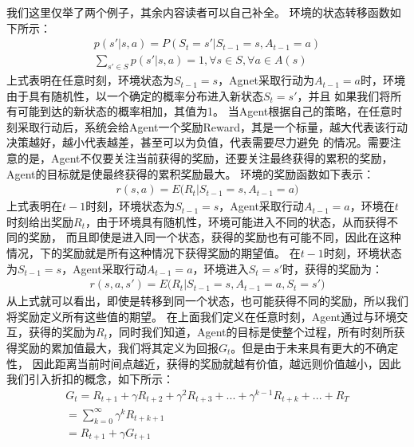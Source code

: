 我们这里仅举了两个例子，其余内容读者可以自己补全。
环境的状态转移函数如下所示：
\begin{equation}
\begin{aligned}
p(s' | s, a) = P(S_{t}=s' | S_{t-1}=s, A_{t-1}=a) \\
\sum_{s' \in S} p(s' | s, a) = 1, \forall s \in S, \forall a \in A(s)
\end{aligned}
\label{env-state-transition-function}
\end{equation}
上式表明在任意时刻，环境状态为$S_{t-1}=s$，Agnet采取行动为$A_{t-1}=a$时，环境由于具有随机性，以一个确定的概率分布进入新状态$S_{t}=s'$，并且
如果我们将所有可能到达的新状态的概率相加，其值为1。
当Agent根据自己的策略，在任意时刻采取行动后，系统会给Agent一个奖励Reward，其是一个标量，越大代表该行动决策越好，越小代表越差，甚至可以为负值，代表需要尽力避免
的情况。需要注意的是，Agent不仅要关注当前获得的奖励，还要关注最终获得的累积的奖励，Agent的目标就是使最终获得的累积奖励最大。
环境的奖励函数如下表示：
\begin{equation}
\begin{aligned}
r(s, a) = E\bigg( R_{t} | S_{t-1}=s, A_{t-1}=a \bigg)
\end{aligned}
\label{env-reward-function}
\end{equation}
上式表明在$t-1$时刻，环境状态为$S_{t-1}=s$，Agent采取行动$A_{t-1}=a$，环境在$t$时刻给出奖励$R_{t}$，由于环境具有随机性，环境可能进入不同的状态，从而获得不同的奖励，
而且即使是进入同一个状态，获得的奖励也有可能不同，因此在这种情况，下的奖励就是所有这种情况下获得奖励的期望值。
在$t-1$时刻，环境状态为$S_{t-1}=s$，Agent采取行动$A_{t-1}=a$，环境进入$S_{t}=s'$时，获得的奖励为：
\begin{equation}
\begin{aligned}
r(s, a, s') = E\bigg( R_{t} | S_{t-1}=s, A_{t-1}=a, S_{t}=s' \bigg)
\end{aligned}
\label{env-reward-function-sas}
\end{equation}
从上式就可以看出，即使是转移到同一个状态，也可能获得不同的奖励，所以我们将奖励定义所有这些值的期望。
在上面我们定义在任意时刻，Agent通过与环境交互，获得的奖励为$R_{t}$，同时我们知道，Agent的目标是使整个过程，所有时刻所获得奖励的累加值最大，我们将其定义为回报$G_{t}$。但是由于未来具有更大的不确定性，
因此距离当前时间点越近，获得的奖励就越有价值，越远则价值越小，因此我们引入折扣的概念，如下所示：
\begin{equation}
\begin{aligned}
G_{t} = R_{t+1} + \gamma R_{t+2} + \gamma ^{2} R_{t+3} + ... + \gamma ^{k-1} R_{t+k} + ... + R_{T} \\
= \sum_{k=0}^{\infty} \gamma ^{k} R_{t+k+1} \\
=R_{t+1} + \gamma G_{t+1}
\end{aligned}
\label{env-reward-function-sas}
\end{equation}

